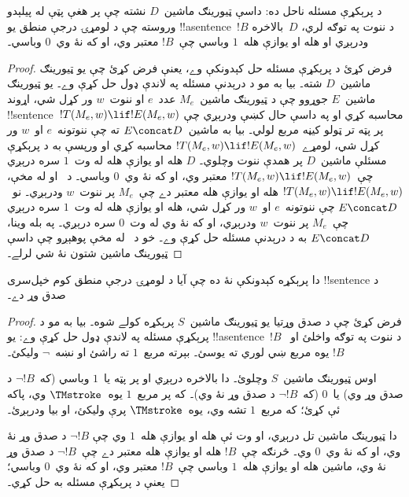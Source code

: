 \documentclass[../../../include/open-logic-section]{subfiles}
\begin{document}

\begin{thm}
د پرېکړې مسئله ناحل ده: داسې ټيورينګ ماشين~$D$ نشته چې پر هغې پټې
له پيلېدو وروسته چې د لومړۍ درجې منطق يو !!a{sentence}~$!B$ د ننوت
په توګه لري، $D$~بالاخره ودرېږي او هله او يوازې هله~$1$ وباسي چې~$!B$
معتبر وي، او که نۀ وي~$0$ وباسي۔
\end{thm}

\begin{proof}
فرض کړئ د پرېکړې مسئله حل کېدونکې وے، يعنې فرض کړئ چې يو ټيورينګ
ماشين~$D$ شته۔ بيا به مو د درېدنې مسئله په لاندې ډول حل کړې وے۔ يو
ټيورينګ ماشين~$E$ جوړوو چې د ټيورينګ ماشين~$M_e$ عدد~$e$ او
ننوت~$w$ ور کړل شي، اړوند !!{sentence}~$!T(M_e, w) \lif !E(M_e,
w)$ محاسبه کړي او په داسې حال کښې ودرېږي چې پر پټه تر ټولو کيڼه
مربع لولي۔ بيا به ماشين~$E \concat D$ ته چې ننوتونه~$e$ او~$w$ ور
کړل شي، لومړے~$!T(M_e, w) \lif !E(M_e, w)$ محاسبه کړي او ورپسې به
د پرېکړې مسئلې ماشين~$D$ پر همدې ننوت وچلوي۔ $D$ هله او يوازې هله
له وت~$1$ سره درېږي چې~$!T(M_e, w) \lif !E(M_e, w)$ معتبر وي، او
که نۀ وي~$0$ وباسي۔ د~ او
 له مخې، $!T(M_e, w) \lif !E(M_e, w)$
هله او يوازې هله معتبر دے چې~$M_e$ پر ننوت~$w$ ودرېږي۔ نو~$E
\concat D$ چې ننوتونه~$e$ او~$w$ ور کړل شي، هله او يوازې هله له
وت~$1$ سره درېږي چې~$M_e$ پر ننوت~$w$ ودرېږي، او که نۀ وي له
وت~$0$ سره درېږي۔ په بله وينا، $E \concat D$ به د درېدنې مسئله حل
کړې وے۔ خو د~ له مخې پوهېږو چې داسې
ټيورينګ ماشين شتون نۀ شي لرلے۔
\end{proof}

\begin{cor}%
دا پرېکړه کېدونکې نۀ ده چې آيا د لومړۍ درجې منطق کوم خپل‌سری
!!{sentence} د صدق وړ دے۔
\end{cor}

\begin{proof}
  فرض کړئ چې د صدق وړتيا يو ټيورينګ ماشين~$S$ پرېکړه کولے شوه۔ بيا
  به مو د پرېکړې مسئله په لاندې ډول حل کړې وے: يو
  !!a{sentence}~$!B$ د ننوت په توګه واخلئ او~$!B$ يوه مربع ښي لوري
  ته يوسئ۔ بېرته مربع~$1$ ته راشئ او نښه~$\lnot$ وليکئ۔

  اوس ټيورينګ ماشين~$S$ وچلوئ۔ دا بالاخره درېږي او پر پټه يا~$1$
  وباسي (که~$\lnot !B$ د صدق وړ وي) يا~$0$ (که~$\lnot !B$ د صدق
  وړ نۀ وي)۔ که پر مربع~$1$ يوه~$\TMstroke$ وي، پاکه ئې کړئ؛ که
  مربع~$1$ تشه وي، يوه~$\TMstroke$ پرې وليکئ، او بيا ودرېږئ۔

  دا ټيورينګ ماشين تل درېږي، او وت ئې هله او يوازې هله~$1$ وي چې
  $\lnot !B$ د صدق وړ نۀ وي، او که نۀ وي~$0$ وي۔ څرنګه چې~$!B$ هله
  او يوازې هله معتبر دے چې~$\lnot !B$ د صدق وړ نۀ وي، ماشين هله او
  يوازې هله~$1$ وباسي چې~$!B$ معتبر وي، او که نۀ وي~$0$ وباسي؛
  يعنې د پرېکړې مسئله به حل کړي۔
\end{proof}
\end{document}
